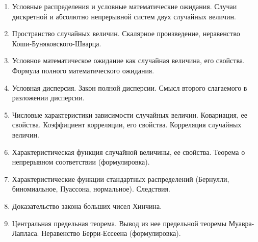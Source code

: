 \begin{enumerate}
    \item Условные распределения и условные математические ожидания. Случаи дискретной и абсолютно непрерывной систем двух случайных величин.
    \item Пространство случайных величин. Скалярное произведение, неравенство Коши-Буняковского-Шварца. 
    \item Условное математическое ожидание как случайная величина, его свойства. Формула полного математического ожидания.
    \item Условная дисперсия. Закон полной дисперсии. Смысл второго слагаемого в разложении дисперсии.
    \item Числовые характеристики зависимости случайных величин. Ковариация, ее свойства. Коэффициент корреляции, его свойства. Корреляция случайных величин.
    \item Характеристическая функция случайной величины, ее свойства. Теорема о непрерывном соответствии (формулировка).
    \item Характеристические функции стандартных распределений (Бернулли, биномиальное, Пуассона, нормальное). Следствия.
    \item Доказательство закона больших чисел Хинчина.
    \item Центральная предельная теорема. Вывод из нее предельной теоремы Муавра-Лапласа. Неравенство Берри-Ессеена (формулировка). 
\end{enumerate}
